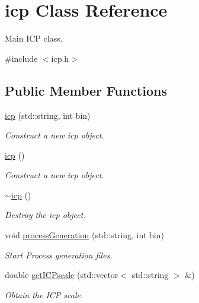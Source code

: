 \hypertarget{classicp}{}\section{icp Class Reference}
\label{classicp}


Main I\+CP class.  




{\ttfamily \#include $<$icp.\+h$>$}

\subsection*{Public Member Functions}
\begin{DoxyCompactItemize}
\item 
\hyperlink{classicp_a16dfbc3ddb18a613cfd4fb8861d0c16a}{icp} (std\+::string, int bin)
\begin{DoxyCompactList}\small\item\em Construct a new icp object. \end{DoxyCompactList}\item 
\mbox{\label{classicp_a4f30b3d50f65a223095db3115d6393f2}} 
\hyperlink{classicp_a4f30b3d50f65a223095db3115d6393f2}{icp} ()
\begin{DoxyCompactList}\small\item\em Construct a new icp object. \end{DoxyCompactList}\item 
\mbox{\label{classicp_a4ddd15fc41c8005f7eaed9fb5b7ecf00}} 
\hyperlink{classicp_a4ddd15fc41c8005f7eaed9fb5b7ecf00}{$\sim$icp} ()
\begin{DoxyCompactList}\small\item\em Destroy the icp object. \end{DoxyCompactList}\item 
void \hyperlink{classicp_aca508e79450dce34131b83ed2a4a1d95}{process\+Generation} (std\+::string, int bin)
\begin{DoxyCompactList}\small\item\em Start Process generation files. \end{DoxyCompactList}\item 
double \hyperlink{classicp_af5adbefb80bcd764306af7361e2a532a}{get\+I\+C\+Pscale} (std\+::vector$<$ std\+::string $>$ \&)
\begin{DoxyCompactList}\small\item\em Obtain the I\+CP scale. \end{DoxyCompactList}\end{DoxyCompactItemize}


